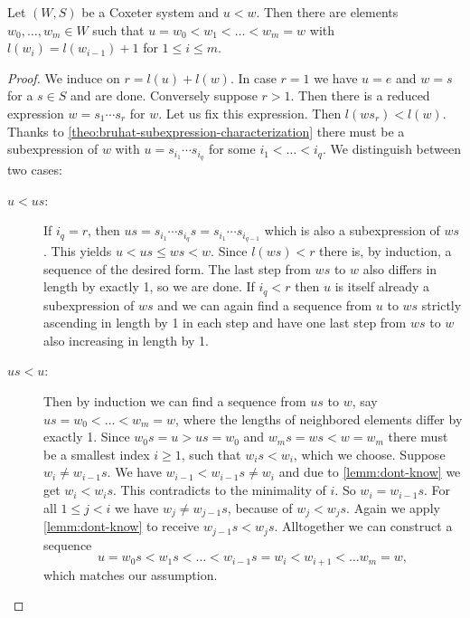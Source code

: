 \begin{prop}
	Let $(W,S)$ be a Coxeter system and $u < w$. Then there are elements $w_0,\ldots,w_m \in W$ such that $u = w_0 < w_1 < \ldots < w_m = w$ with $l(w_i) = l(w_{i-1}) + 1$ for $1 \leq i \leq m$.

	\begin{proof}
		We induce on $r = l(u) + l(w)$. In case $r = 1$ we have $u = e$ and $w = s$ for a $s \in S$ and are done. Conversely suppose $r > 1$. Then there is a reduced expression $w = s_1 \cdots s_r$ for $w$. Let us fix this expression. Then $l(w s_r) < l(w)$. Thanks to \ref{theo:bruhat-subexpression-characterization} there must be a subexpression of $w$ with $u = s_{i_1} \cdots s_{i_q}$ for some $i_1 < \ldots < i_q$. We distinguish between two cases:

		\begin{description}
			\item[$u < us$:] If $i_q = r$, then $us = s_{i_1} \cdots s_{i_q} s = s_{i_1} \cdots s_{i_{q-1}}$ which is also a subexpression of $ws$. This yields $u < us \leq ws < w$. Since $l(ws) < r$ there is, by induction, a sequence of the desired form. The last step from $ws$ to $w$ also differs in length by exactly 1, so we are done. If $i_q < r$ then $u$ is itself already a subexpression of $ws$ and we can again find a sequence from $u$ to $ws$ strictly ascending in length by 1 in each step and have one last step from $ws$ to $w$ also increasing in length by 1.
			\item[$us < u$:] Then by induction we can find a sequence from $us$ to $w$, say $us = w_0 < \ldots < w_m = w$, where the lengths of neighbored elements differ by exactly 1. Since $w_0 s = u > us = w_0$ and $w_m s = ws < w = w_m$ there must be a smallest index $i \geq 1$, such that $w_i s < w_i$, which we choose. Suppose $w_i \neq w_{i-1} s$. We have $w_{i-1} < w_{i-1}s \neq w_i$ and due to \ref{lemm:dont-know} we get $w_i < w_i s$. This contradicts to the minimality of $i$. So $w_i = w_{i-1} s$. For all $1 \leq j < i$ we have $w_j \neq w_{j-1} s$, because of $w_j < w_j s$. Again we apply \ref{lemm:dont-know} to receive $w_{j-1} s < w_j s$. Alltogether we can construct a sequence
			$$ u = w_0 s < w_1 s < \ldots < w_{i-1} s = w_i < w_{i+1} < \ldots w_m = w, $$
			which matches our assumption. \qedhere
		\end{description}
	\end{proof}
\end{prop}

